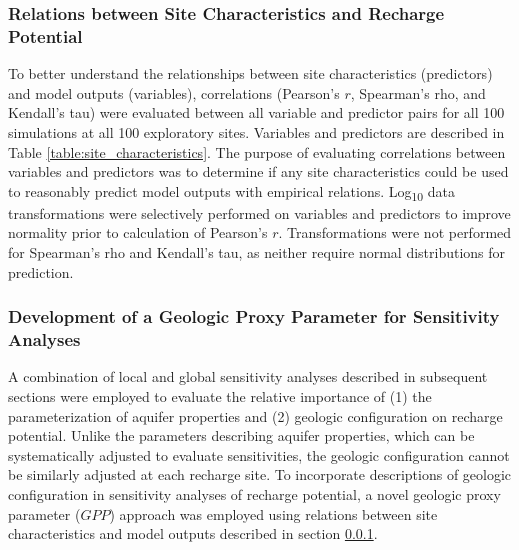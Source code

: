 \subsubsection{Relations between Site Characteristics and Recharge Potential} \label{sssec:MM_relations}
To better understand the relationships between site characteristics (predictors) and model outputs (variables), correlations (Pearson's $r$, Spearman's rho, and Kendall's tau) were evaluated between all variable and predictor pairs for all 100 simulations at all 100 exploratory sites. Variables and predictors are described in Table \ref{table:site_characteristics}. The purpose of evaluating correlations between variables and predictors was to determine if any site characteristics could be used to reasonably predict model outputs with empirical relations. Log\textsubscript{10} data transformations were selectively performed on variables and predictors to improve normality prior to calculation of Pearson's $r$. Transformations were not performed for Spearman's rho and Kendall's tau, as neither require normal distributions for prediction.

\subsubsection{Development of a Geologic Proxy Parameter for Sensitivity Analyses} \label{sssec:MM_proxy_parameter}

A combination of local and global sensitivity analyses described in subsequent sections were employed to evaluate the relative importance of (1) the parameterization of aquifer properties and (2) geologic configuration on recharge potential. Unlike the parameters describing aquifer properties, which can be systematically adjusted to evaluate sensitivities, the geologic configuration cannot be similarly adjusted at each recharge site. To incorporate descriptions of geologic configuration in sensitivity analyses of recharge potential, a novel geologic proxy parameter ($GPP$) approach was employed using relations between site characteristics and model outputs described in section \ref{sssec:MM_relations}.

